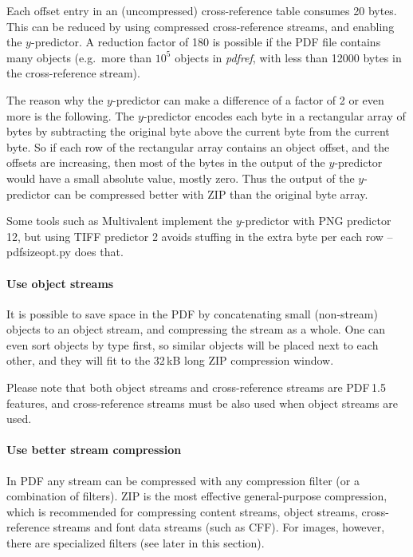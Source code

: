 \documentclass{ltugproc}
\def\cmd{\textsf}
\begin{document}
Each offset entry in an (uncompressed) cross-reference table consumes 20
bytes. This can be reduced by using compressed cross-reference streams, and
enabling the $y$-predictor. A reduction factor of 180 is possible if the
PDF file contains many objects (e.g.\ more than $10^5$ objects in
\emph{pdfref}, with less than 12000 bytes in the cross-reference stream).

The reason why the $y$-predictor can make a difference of a factor of 2 or
even more is the following.
The $y$-predictor encodes each byte in a rectangular array of bytes by
subtracting the original byte above the current byte from the current byte.
So if each row of the rectangular array contains an object offset, and the
offsets are increasing, then most of the bytes in the output of the
$y$-predictor would have a small absolute value, mostly zero. Thus the
output of the $y$-predictor can be compressed better with ZIP than
the original byte array.

Some tools such as Multivalent implement the $y$-predictor with PNG
predictor 12, but using TIFF predictor 2 avoids stuffing in the extra byte
per each row -- \cmd{pdfsizeopt.py} does that.

\paragraph{Use object streams}

It is possible to save space in the PDF by concatenating small (non-stream)
objects to an object stream, and compressing the stream as a whole. One can
even sort objects by type first, so similar objects will be placed next to
each other, and they will fit to the 32\,kB long ZIP compression window.

Please note that both object streams and cross-reference streams are
PDF\,1.5 features, and cross-reference streams must be also used when object
streams are used.

\paragraph{Use better stream compression}

In PDF any stream can be compressed with any compression filter (or a
combination of filters). ZIP is the most effective general-purpose
compression, which is recommended for compressing content streams, object
streams, cross-reference streams and font data streams (such as CFF).
For images, however, there are specialized filters (see later in this
section).
\end{document}
